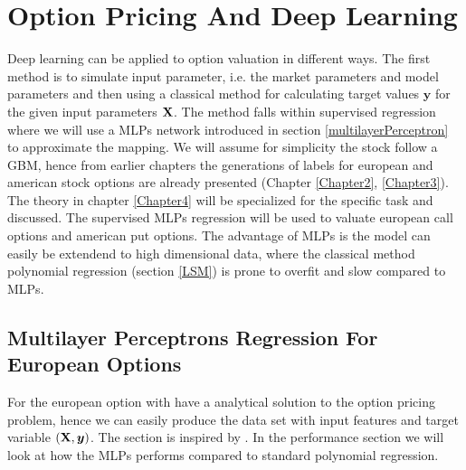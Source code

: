 
\chapter{Option Pricing And Deep Learning} %

\label{Chapter5} %

Deep learning can be applied to option valuation in different ways. The first method is to simulate input parameter, i.e. the market parameters and model parameters and then using a classical method for calculating target values $\bm{y}$ for the given input parameters $\mathbf{X}$. The method falls within supervised regression where we will use a MLPs network introduced in section \ref{multilayerPerceptron} to approximate the mapping. We will assume for simplicity the stock follow a GBM, hence from earlier chapters the generations of labels for european and american stock options are already presented (Chapter \ref{Chapter2}, \ref{Chapter3}). The theory in chapter \ref{Chapter4} will be specialized for the specific task and discussed. The supervised MLPs regression will be used to valuate european call options and american put options. The advantage of MLPs is the model can easily be extendend to high dimensional data, where the classical method polynomial regression (section \ref{LSM}) is prone to overfit and slow compared to MLPs. 


\section{Multilayer Perceptrons Regression For European Options}
For the european option with have a analytical solution to the option pricing problem, hence we can easily produce the data set with input features and target variable $(\mathbf{X},\bm{y})$. The section is inspired by \parencite{HirsaAli2019}. In the performance section we will look at how the MLPs performs compared to standard polynomial regression.

